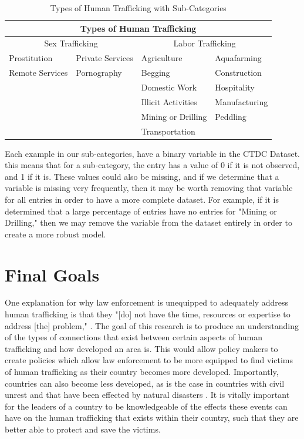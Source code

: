 \documentclass{article} %
\begin{document}
\FloatBarrier
\begin{table}[htb]
	\begin{tabular}{ |p{3cm}|p{3cm}||p{3cm}|p{3cm}|  }
		\hline
		\multicolumn{4}{|c|}{Types of Human Trafficking}                                 \\ \hline
		\multicolumn{2}{|c||}{Sex Trafficking} & \multicolumn{2}{|c|}{Labor Trafficking} \\ \hline
		Prostitution    & Private Services     & Agriculture        & Aquafarming        \\
		Remote Services & Pornography          & Begging            & Construction       \\
		&                      & Domestic Work      & Hospitality        \\
		&                      & Illicit Activities & Manufacturing      \\
		&                      & Mining or Drilling & Peddling           \\
		&                      & Transportation     &                    \\ \hline
	\end{tabular}
	\caption{Types of Human Trafficking with Sub-Categories}
\end{table}
\FloatBarrier

Each example in our sub-categories, have a binary variable in the CTDC Dataset. this means that for a sub-category, the entry has a value of 0 if it is not observed, and 1 if it is. These values could also be missing, and if we determine that a variable is missing very frequently, then it may be worth removing that variable for all entries in order to have a more complete dataset. For example, if it is determined that a large percentage of entries have no entries for "Mining or Drilling," then we may remove the variable from the dataset entirely in order to create a more robust model.


\section{Final Goals}

One explanation for why law enforcement is unequipped to adequately address human trafficking is that they "[do] not have the time,
resources or expertise to address [the] problem," \parencite{LawResponse}. The goal of this research is to produce an understanding of the types of connections that exist between certain aspects of human trafficking and how developed an area is. This would allow policy makers to create policies which allow law enforcement to be more equipped to find victims of human trafficking as their country becomes more developed. Importantly, countries can also become less developed, as is the case in countries with civil unrest and that have been effected by natural disasters \parencite{bar2010}. It is vitally important for the leaders of a country to be knowledgeable of the effects these events can have on the human trafficking that exists within their country, such that they are better able to protect and save the victims.


\printbibliography
\end{document}
